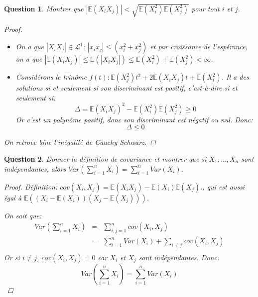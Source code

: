 \documentclass{article}
\theoremstyle{plain}
\newtheorem{question}{Question}
\begin{document}
\begin{question}
	Montrer que $|\mathbb{E} (X_iX_j)| < \sqrt{\mathbb{E} (X_i^2) \mathbb{E} (X_j^2)}$ pour tout $i$ et $j$.
	\begin{proof}
		\begin{itemize}
			\item On a que $|X_iX_j| \in \mathscr{L}^1$: $|x_ix_j| \leq (x_i^2 + x_j^2)$ et par croissance de l'espérance,
			      on a que $|\mathbb{E} (X_iX_j)| \leq \mathbb{E} (|X_iX_j|) \leq \mathbb{E} (X_i^2) + \mathbb{E} (X_j^2) < \infty$.
			\item Considérons le trinôme $f(t): \mathbb{E}(X_j^2)t^2 + 2\mathbb{E}(X_iX_j)t + \mathbb{E}(X_i^2)$. Il a des solutions si et seulement si son discriminant est positif, c'est-à-dire si et seulement si:
			      \begin{equation*}
				      \Delta = \mathbb{E}(X_iX_j)^2 - \mathbb{E}(X_i^2)\mathbb{E}(X_j^2) \geq 0
			      \end{equation*}
			      Or c'est un polynôme positif, donc son discriminant est négatif ou nul. Donc:
			      \begin{equation*}
				      \Delta \leq 0
			      \end{equation*}
		\end{itemize}

		On retrove bine l'inégalité de Cauchy-Schwarz.
	\end{proof}
\end{question}

\begin{question}
	Donner la définition de covariance et montrer que si $X_1, \dots, X_n$ sont indépendantes, alors $Var(\sum_{i=1}^n X_i) = \sum_{i=1}^n Var(X_i)$.
	\begin{proof}
		Définition: $cov(X_i, X_j) = \mathbb{E} (X_iX_j) - \mathbb{E} (X_i) \mathbb{E} (X_j)$., qui est aussi égal à $\mathbb{E} ((X_i - \mathbb{E} (X_i))(X_j - \mathbb{E} (X_j)))$.

		On sait que:
		\begin{eqnarray*}
			Var(\sum_{i=1}^n X_i) &=& \sum_{i,j=1}^n cov(X_i, X_j) \\
			&=& \sum_{i=1}^n Var(X_i) + \sum_{i \neq j} cov(X_i, X_j) \\
		\end{eqnarray*}
		Or si $i \neq j$, $cov(X_i, X_j) = 0$ car $X_i$ et $X_j$ sont indépendantes. Donc:
		\begin{equation*}
			Var(\sum_{i=1}^n X_i) = \sum_{i=1}^n Var(X_i)
		\end{equation*}

	\end{proof}
\end{question}
\end{document}
